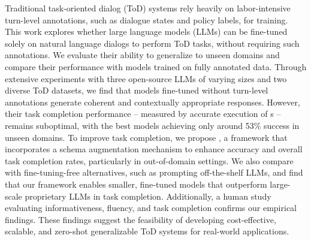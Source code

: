 Traditional task-oriented dialog (ToD) systems rely heavily on labor-intensive turn-level annotations, such as dialogue states and policy labels, for training. 
This work explores whether large language models (LLMs) can be fine-tuned solely on natural language dialogs to perform ToD tasks, without requiring such annotations. We evaluate their ability to generalize to unseen domains and compare their performance with models trained on fully annotated data.
Through extensive experiments with three open-source LLMs of varying sizes and two diverse ToD datasets, we find that models fine-tuned without turn-level annotations generate coherent and contextually appropriate responses.
However, their task completion performance -- measured by accurate execution of {\apicall}s -- remains suboptimal, with the best models achieving only around 53\% success in unseen domains.
To improve task completion, we propose {\oursys}, a framework that incorporates a schema augmentation mechanism to enhance {\apicall} accuracy and overall task completion rates, particularly in out-of-domain settings. 
We also compare {\oursys} with fine-tuning-free alternatives, such as prompting off-the-shelf LLMs, and find that our framework enables smaller, fine-tuned models that outperform large-scale proprietary LLMs in task completion. 
Additionally, a human study evaluating informativeness, fluency, and task completion confirms our empirical findings. 
These findings suggest the feasibility of developing cost-effective, scalable, and zero-shot generalizable ToD systems for real-world applications.
